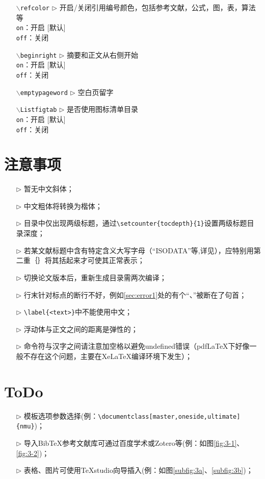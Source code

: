 \begin{itemize}[leftmargin=3cm]
	\item[{\tt  $\backslash$refcolor} $\triangleright$]  开启/关闭引用编号颜色，包括参考文献，公式，图，表，算法等\\
	\texttt{on}：开启 [默认]\\
	\texttt{off}：关闭
	\item[{\tt $\backslash$beginright} $\triangleright$]  摘要和正文从右侧开始\\
	\texttt{on}：开启 [默认]\\
	\texttt{off}：关闭
	\item[{\tt $\backslash$emptypageword} $\triangleright$]  空白页留字
	\item[{\tt $\backslash$Listfigtab} $\triangleright$]  是否使用图标清单目录\\
	\texttt{on}：开启 [默认]\\
	\texttt{off}：关闭
\end{itemize}


\section{注意事项}
\begin{itemize}
  \item[$\triangleright$] 暂无中文斜体；
  \item[$\triangleright$] 中文粗体将转换为楷体；
  \item[$\triangleright$] 目录中仅出现两级标题，通过\verb|\setcounter{tocdepth}{1}|设置两级标题目录深度；
  \item[$\triangleright$] 若某文献标题中含有特定含义大写字母（“ISODATA”等,详见\cite{Li2017An}），应特别用第二重｛｝将其括起来才可使其正常表示；
  \item[$\triangleright$] 切换论文版本后，重新生成目录需两次编译；
  \item[$\triangleright$] 行末针对标点的断行不好，例如\ref{sec:error1}处的有个“、”被断在了句首；
  \item[$\triangleright$] \verb|\label{<text>}|中不能使用中文；
  \item[$\triangleright$] 浮动体与正文之间的距离是弹性的；
  \item[$\triangleright$] 命令符与汉字之间请注意加空格以避免undefined错误（pdfLaTeX下好像一般不存在这个问题，主要在XeLaTeX编译环境下发生）；
\end{itemize}

\section{ToDo}
\begin{itemize}
  \item[$\triangleright$] 模板选项参数选择(例：\verb|\documentclass[master,oneside,ultimate]{nmu}|)；
  \item[$\triangleright$] 导入BibTeX参考文献库可通过百度学术或Zotero等(例：如图\ref{fig:3-1}、\ref{fig:3-2})；
  \item[$\triangleright$] 表格、图片可使用TeXstudio向导插入(例：如图\ref{subfig:3a}、\ref{subfig:3b})；
\end{itemize}

